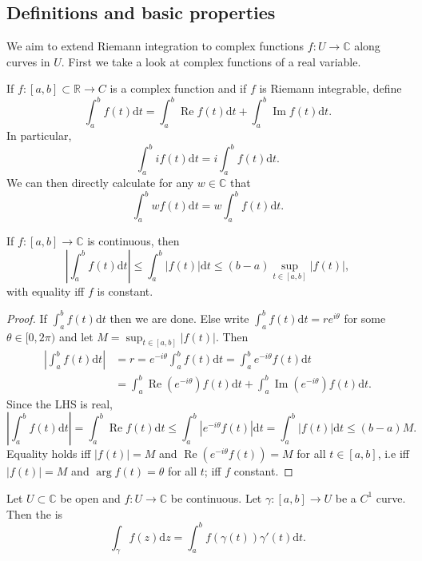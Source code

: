 \documentclass[a4paper]{scrartcl}
\begin{document}
\subsection{Definitions and basic properties}
We aim to extend Riemann integration to complex functions $f: U \rightarrow \mathbb{C}$ along curves in $U$. First we take a look at complex functions of a real variable. 
\begin{definition*}
      If $f: [a,b] \subset \mathbb{R} \rightarrow C$ is a complex function and if $f$ is Riemann integrable, define \[
      \int_{a}^{b}f (t) \mathrm{d}t= \int_{a}^{b}\operatorname{Re} f (t) \mathrm{d}t+ \int_{a}^{b}\operatorname{Im}f (t) \mathrm{d}t   
      .\] In particular, \[
      \int_{a}^{b}i f (t) \mathrm{d}t =i \int_{a}^{b}f (t) \mathrm{d}t  
      .\] We can then directly calculate for any $w \in \mathbb{C}$ that \[
          \int_{a}^{b}w f (t) \mathrm{d}t =w\int_{a}^{b}f (t) \mathrm{d}t 
      .\] 
\end{definition*}
\begin{proposition}
      If $f: [a,b] \rightarrow \mathbb{C}$ is continuous, then \[
      |\int_{a}^{b} f (t) \mathrm{d}t | \leq \int_{a}^{b} |f (t)| \mathrm{d}t \leq (b-a) \sup_{t \in [a,b]} |f (t)|
      ,\] with equality iff $f$ is constant. 
\end{proposition}
\begin{proof}
      If $\int_{a}^{b}f (t) \mathrm{d}t $ then we are done. Else write $\int_{a}^{b}f (t) \mathrm{d}t= re^{i \theta} $ for some $\theta \in [0,2\pi)$ and let $M=\sup_{t \in [a,b]} |f (t)|$. Then 
      \begin{align*}
           |\int_{a}^{b}f (t) \mathrm{d}t| &=r= e^{-i \theta}\int_{a}^{b}f (t) \mathrm{d}t=\int_{a}^{b}e^{-i \theta}f (t) \mathrm{d}t\\
           &=\int_{a}^{b}\operatorname{Re}(e^{-i \theta}) f (t) \mathrm{d}t+ \int_{a}^{b} \operatorname{Im}(e^{-i \theta})f (t) \mathrm{d}t. 
      \end{align*}
      Since the LHS is real, \[
      |\int_{a}^{b}f (t) \mathrm{d}t|=\int_{a}^{b}\operatorname{Re} f (t) \mathrm{d}t \leq  \int_{a}^{b}|e^{-i \theta} f (t)| \mathrm{d}t=\int_{a}^{b}| f (t)| \mathrm{d}t\leq (b-a)M
      .\] 
      Equality holds iff $|f (t)|=M$ and $\operatorname{Re} (e ^{-i \theta}f (t))=M$ for all $t \in [a,b]$, i.e iff $|f (t)|=M$ and $\operatorname{arg} f (t)= \theta$ for all $t$; iff $f$ constant.
\end{proof}
\begin{definition*}
      Let $U \subset \mathbb{C}$ be open and $f: U \rightarrow \mathbb{C}$ be continuous. Let $\gamma: [a,b] \rightarrow U$ be a $C^1$ curve. Then the  is \[
      \int_{\gamma}^{}f (z) \mathrm{d}z= \int_{a}^{b} f (\gamma (t))\gamma' (t) \mathrm{d}t  
      .\]
\end{definition*}
\end{document}
